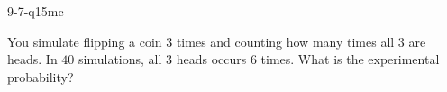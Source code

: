 \begin{practiceQuestion}{9-7-q15}{mc}
\begin{questionText}
You simulate flipping a coin $3$ times and counting how many times all $3$ are heads. In $40$ simulations, all $3$ heads occurs $6$ times. What is the experimental probability?
\end{questionText}
\end{practiceQuestion}
